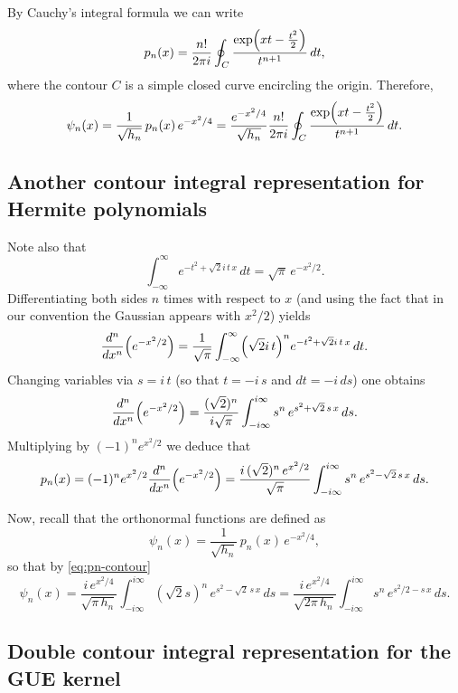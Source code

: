 \documentclass[letterpaper,11pt,oneside,reqno]{article}
\numberwithin{equation}{section}
\theoremstyle{definition}
\begin{document}
By Cauchy's integral formula we can write
\[
p_n(x)=\frac{n!}{2\pi i}\oint_C\frac{\exp\Bigl(xt-\frac{t^2}{2}\Bigr)}{t^{n+1}}\,dt,
\]
where the contour \(C\) is a simple closed curve encircling the origin.
Therefore,
\begin{equation*}
	\psi_n(x)=\frac{1}{\sqrt{h_n}}\,p_n(x)\,e^{-x^2/4}=
	\frac{e^{-x^2/4}}{\sqrt{h_n}}\frac{n!}{2\pi i}\oint_C\frac{\exp\Bigl(xt-\frac{t^2}{2}\Bigr)}{t^{n+1}}\,dt.
\end{equation*}


\subsection{Another contour integral representation for Hermite polynomials}

Note also that
\[
\int_{-\infty}^{\infty} e^{-t^2+\sqrt{2} i\,t\,x}\,dt
=\sqrt{\pi}\,e^{-x^2/2}.
\]
Differentiating both sides \(n\) times with respect to \(x\) (and using the fact that in our convention the Gaussian appears with \(x^2/2\)) yields
\[
\frac{d^n}{dx^n}\Bigl(e^{-x^2/2}\Bigr)
=\frac{1}{\sqrt{\pi}}\int_{-\infty}^{\infty} \Bigl(\sqrt{2}i\,t\Bigr)^n
e^{-t^2+\sqrt{2} i\,t\,x}\,dt.
\]
Changing variables via \(s=i\,t\) (so that \(t=-i\,s\) and \(dt=-i\,ds\)) one obtains
\[
\frac{d^n}{dx^n}\Bigl(e^{-x^2/2}\Bigr)
=\frac{(\sqrt{2})^n}{i\sqrt{\pi}}
\int_{-i\infty}^{i\infty} s^n\,e^{s^2+\sqrt{2}\,s\,x}\,ds.
\]
Multiplying by \((-1)^n e^{x^2/2}\) we deduce that
\begin{equation}
\label{eq:pn-contour}
p_n(x)
=(-1)^n e^{x^2/2}\frac{d^n}{dx^n}\Bigl(e^{-x^2/2}\Bigr)
=\frac{i\,(\sqrt{2})^n\,e^{x^2/2}}{\sqrt{\pi}}
\int_{-i\infty}^{i\infty} s^n\,e^{s^2-\sqrt{2}\,s\,x}\,ds.
\end{equation}

Now, recall that the orthonormal functions are defined as
\[
\psi_n(x)=\frac{1}{\sqrt{h_n}}\,p_n(x)\,e^{-x^2/4},
\]
so that by \eqref{eq:pn-contour}
\[
\psi_n(x)
=\frac{i\,e^{x^2/4}}{\sqrt{\pi\,h_n}}
\int_{-i\infty}^{i\infty}(\sqrt2 s)^n\,e^{s^2-\sqrt{2}\,s\,x}\,ds
=
\frac{i\,e^{x^2/4}}{\sqrt{2\pi\,h_n}}
\int_{-i\infty}^{i\infty}s^n\,e^{s^2/2-s\,x}\,ds.
\]

\subsection{Double contour integral representation for the GUE kernel}
\end{document}
